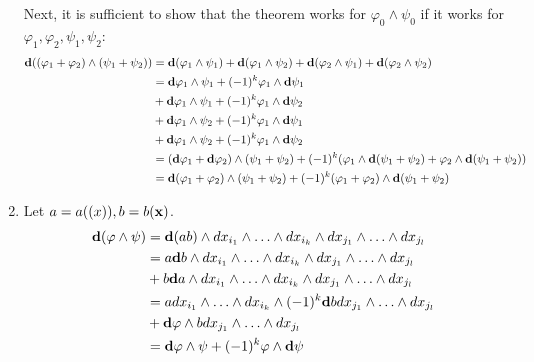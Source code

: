 \documentclass{homework}
\begin{document}
\begin{problem}{6}
\begin{enumerate}
      Next, it is sufficient to show that the theorem works for
      $\varphi_0 \land \psi_0$ if it works for
      $\varphi_1, \varphi_2, \psi_1, \psi_2$:
      \begin{align*}
        \mathbf{d}((\varphi_1 + \varphi_2) \land (\psi_1 + \psi_2)) &=
        \mathbf{d}(\varphi_1 \land \psi_1) + \mathbf{d}(\varphi_1 \land \psi_2) +
        \mathbf{d}(\varphi_2 \land \psi_1) + \mathbf{d}(\varphi_2 \land \psi_2) \\ &=
        \mathbf{d}\varphi_1 \land \psi_1 + (-1)^k\varphi_1 \land \mathbf{d}\psi_1 \\ &+
        \mathbf{d}\varphi_1 \land \psi_1 + (-1)^k\varphi_1 \land \mathbf{d}\psi_2 \\ &+
        \mathbf{d}\varphi_1 \land \psi_2 + (-1)^k\varphi_1 \land \mathbf{d}\psi_1 \\ &+
        \mathbf{d}\varphi_1 \land \psi_2 + (-1)^k\varphi_1 \land \mathbf{d}\psi_2 \\ &=
        (\mathbf{d} \varphi_1 + \mathbf{d} \varphi_2) \land (\psi_1 + \psi_2) +
        (-1)^k (\varphi_1 \land \mathbf{d}(\psi_1 + \psi_2) +
                \varphi_2 \land \mathbf{d}(\psi_1 + \psi_2)) \\ &=
        \mathbf{d}(\varphi_1 + \varphi_2) \land (\psi_1 + \psi_2) +
        (-1)^k (\varphi_1 + \varphi_2) \land \mathbf{d}(\psi_1 + \psi_2)
      \end{align*}
    \item
      Let $a = a(\mathbf{(}x)), b = b(\mathbf{x})$.
      \begin{align*}
        \mathbf{d}(\varphi \land \psi) &=
        \mathbf{d}(ab) \land dx_{i_1} \land \hdots \land dx_{i_k}
                \land dx_{j_1} \land \hdots \land dx_{j_l} \\ &=
        a \mathbf{d} b
          \land dx_{i_1} \land \hdots \land dx_{i_k}
          \land dx_{j_1} \land \hdots \land dx_{j_l} \\ &+
        b \mathbf{d} a
          \land dx_{i_1} \land \hdots \land dx_{i_k}
          \land dx_{j_1} \land \hdots \land dx_{j_l} \\ &=
        a dx_{i_1} \land \hdots \land dx_{i_k} \land
        (-1)^k\mathbf{d} b dx_{j_1} \land \hdots \land dx_{j_l} \\ &+
        \mathbf{d} \varphi \land
        b dx_{j_1} \land \hdots \land dx_{j_l} \\ &=
        \mathbf{d} \varphi \land \psi +
        (-1)^k \varphi \land \mathbf{d} \psi
      \end{align*}
  \end{enumerate}
\end{problem}
\end{document}
